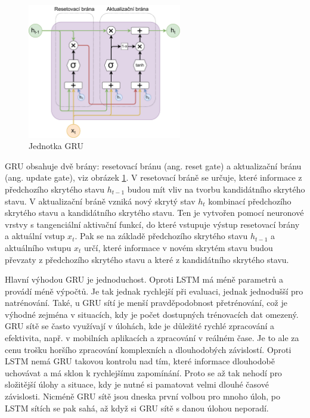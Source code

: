 \begin{figure}
    \centering
    \includegraphics[width=0.6\textwidth]{Figures/GRU_unit.pdf}
    \caption{Jednotka GRU}
    \label{fig:gru_unit}
\end{figure}

GRU obsahuje dvě brány: resetovací bránu (ang. reset gate) a aktualizační bránu
(ang. update gate), viz obrázek \ref{fig:gru_unit}. V resetovací bráně se
určuje, které informace z předchozího skrytého stavu $h_{t-1}$ budou mít vliv
na tvorbu kandidátního skrytého stavu. V aktualizační bráně vzniká nový skrytý
stav $h_t$ kombinací předchozího skrytého stavu a kandidátního skrytého stavu.
Ten je vytvořen pomocí neuronové vrstvy s tangenciální aktivační funkcí, do
které vstupuje výstup resetovací brány a aktuální vstup $x_t$. Pak se na
základě předchozího skrytého stavu $h_{t-1}$ a aktuálního vstupu $x_t$ určí,
které informace v novém skrytém stavu budou převzaty z předchozího skrytého
stavu a které z kandidátního skrytého stavu.

Hlavní výhodou GRU je jednoduchost. Oproti LSTM má méně parametrů a provádí
méně výpočtů. Je tak jednak rychlejší při evaluaci, jednak jednodušší pro
natrénování. Také, u GRU sítí je menší pravděpodobnost přetrénování, což je
výhodné zejména v situacích, kdy je počet dostupných trénovacích dat omezený. GRU
sítě se často využívají v úlohách, kde je důležité rychlé zpracování a
efektivita, např. v mobilních aplikacích a zpracování v reálném čase. Je to ale
za cenu trošku horšího zpracování komplexních a dlouhodobých závislostí. Oproti
LSTM nemá GRU takovou kontrolu nad tím, které informace dlouhodobě uchovávat a
má sklon k rychlejšímu zapomínání. Proto se až tak nehodí pro složitější úlohy
a situace, kdy je nutné si pamatovat velmi dlouhé časové závislosti. Nicméně GRU sítě
jsou dneska první volbou pro mnoho úloh, po LSTM sítích se pak sahá, až když si
GRU sítě s danou úlohou neporadí.

\endinput